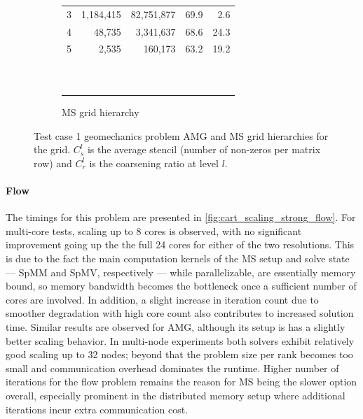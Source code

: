 \begin{figure} [htbp]
\begin{subfigure}[t]{0.48\textwidth}
\begin{tabular}{rrrrr}
			3 &  1,184,415 &    82,751,877 & 69.9 &  2.6 \\
			4 &     48,735 &     3,341,637 & 68.6 & 24.3 \\
			5 &      2,535 &       160,173 & 63.2 & 19.2 \\
			                                             \\
			                                             \\
			                                             \\
			                                             \\
			                                             \\
			                                             \\
			                                             \\
			                                             \\
			                                             \\
      \hline\noalign{\smallskip}
    \end{tabular}
    \caption{MS grid hierarchy}
  \end{subfigure}
  \caption[Test case 1 geomechanics problem grid hierarchies]{Test case 1 geomechanics problem AMG and MS grid hierarchies for the  grid.   $C_s^l$ is the average stencil (number of non-zeros per matrix row) and $C_r^l$ is the coarsening ratio at level $l$.}
  \label{fig:cart_grid_hierarchies}
\end{figure}

\paragraph{Flow}
The timings for this problem are presented in \cref{fig:cart_scaling_strong_flow}.   For multi-core tests, scaling up to 8 cores is observed, with no significant improvement going up the the full 24 cores for either of the two resolutions.   This is due to the fact the main computation kernels of the MS setup and solve state --- SpMM and SpMV, respectively --- while parallelizable, are essentially memory bound, so memory bandwidth becomes the bottleneck once a sufficient number of cores are involved.    In addition, a slight increase in iteration count due to smoother degradation with high core count also contributes to increased solution time.   Similar results are observed for AMG, although its setup is has a slightly better scaling behavior.   In multi-node experiments both solvers exhibit relatively good scaling up to 32 nodes; beyond that the problem size per rank becomes too small and communication overhead dominates the runtime.   Higher number of iterations for the flow problem remains the reason for MS being the slower option overall, especially prominent in the distributed memory setup where additional iterations incur extra communication cost.

